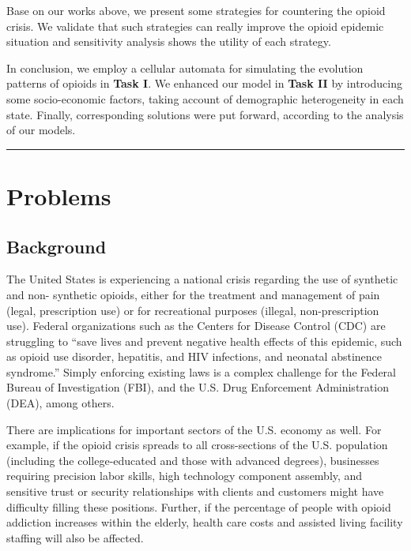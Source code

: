 \documentclass[a4paper]{article}
\newcommand{\HRule}{\rule{\linewidth}{0.5mm}}
\begin{document}
Base on our works above, we present some strategies for countering the opioid crisis. We validate that such strategies can really improve the opioid epidemic situation and sensitivity analysis shows the utility of each strategy. 

In conclusion, we employ a cellular automata for simulating the evolution patterns of opioids in \textbf{Task I}. We enhanced our model in \textbf{Task II} by introducing some socio-economic factors, taking account of demographic heterogeneity in each state. Finally, corresponding solutions were put forward, according to the analysis of our models.


\noindent \HRule
\renewcommand{\baselinestretch}{1.0}
\clearpage
\renewcommand{\baselinestretch}{0.5}
\tableofcontents
\renewcommand{\baselinestretch}{1.0}
\clearpage

\section{Problems}

\subsection{Background}

The United States is experiencing a national crisis regarding the use of synthetic and non- synthetic opioids, either for the treatment and management of pain (legal, prescription use) or for recreational purposes (illegal, non-prescription use). Federal organizations such as the Centers for Disease Control (CDC) are struggling to “save lives and prevent negative health effects of this epidemic, such as opioid use disorder, hepatitis, and HIV infections, and neonatal abstinence syndrome.” Simply enforcing existing laws is a complex challenge for the Federal Bureau of Investigation (FBI), and the U.S. Drug Enforcement Administration (DEA), among others.

There are implications for important sectors of the U.S. economy as well. For example, if the opioid crisis spreads to all cross-sections of the U.S. population (including the college-educated and those with advanced degrees), businesses requiring precision labor skills, high technology component assembly, and sensitive trust or security relationships with clients and customers might have difficulty filling these positions. Further, if the percentage of people with opioid addiction increases within the elderly, health care costs and assisted living facility staffing will also be affected.
\end{document}
